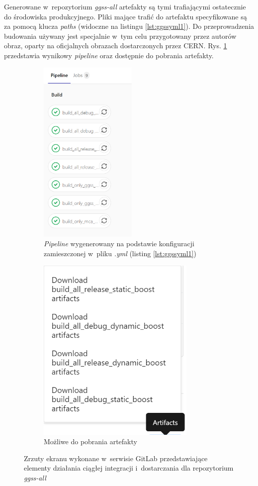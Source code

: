 Generowane w~repozytorium \textit{ggss-all} artefakty są tymi trafiającymi ostatecznie do środowiska produkcyjnego. Pliki mające trafić do artefaktu specyfikowane są za pomocą klucza \textit{paths} (widoczne na listingu \ref{lst:ggssyml1}). Do przeprowadzenia budowania używany jest specjalnie w~tym celu przygotowany przez autorów obraz, oparty na oficjalnych obrazach dostarczonych przez CERN. Rys. \ref{fig:pipelineall} przedstawia wynikowy \textit{pipeline} oraz dostępnie do pobrania artefakty.

\begin{figure}[H]
\centering

\begin{subfigure}{0.4\textwidth}
\centering
\includegraphics[height=9cm]{res/png/runnerPipeline}
\caption{\textit{Pipeline} wygenerowany na podstawie konfiguracji zamieszczonej w~pliku \textit{.yml} (listing \ref{lst:ggssyml1})}
\end{subfigure}
\hspace{0.5cm}
\begin{subfigure}{0.4\textwidth}
\centering
\includegraphics[height=9cm]{res/png/runnerArtifacts}
\caption{Możliwe do pobrania artefakty}
\end{subfigure}

\caption{Zrzuty ekranu wykonane w~serwisie GitLab przedstawiające elementy działania ciągłej integracji i~dostarczania dla repozytorium \textit{ggss-all}}
\label{fig:pipelineall}

\end{figure}

